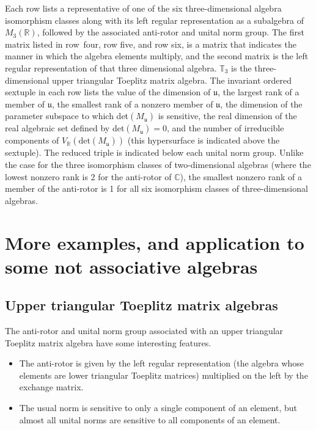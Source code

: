 \documentclass{amsart}
\numberwithin{equation}{section}
\theoremstyle{definition}
\numberwithin{theorem}{section}
\begin{document}
 {\small Each row lists a representative  of one of the six three-dimensional algebra isomorphism classes along with its left regular representation as a subalgebra of $M_3(\mathbb{R})$, followed by the associated anti-rotor and unital norm group. The first matrix listed in \mbox{row four}, row five, and row six, is a matrix that indicates the manner in which the algebra elements multiply, and the second matrix is the left regular representation of that three dimensional algebra.  $\mathbb{T}_3$ is the three-dimensional upper triangular Toeplitz matrix algebra. The invariant ordered sextuple in each row lists the value of the dimension of $\mathfrak{u}$, the largest rank of a member of $\mathfrak{u}$, the smallest rank of a nonzero member of $\mathfrak{u}$, the dimension of the parameter subspace to which det$(M_{\mathfrak{u}})$ is sensitive, the real dimension of the real algebraic set defined by det$(M_{\mathfrak{u}}) =0$, and the number of irreducible components of $V_\mathbb{R}(\text{det}(M_{\mathfrak{u}}))$ (this hypersurface is indicated above the sextuple).  The reduced triple is indicated below each unital norm group.  Unlike the case for the three isomorphism classes of two-dimensional algebras (where the lowest nonzero rank is 2 for the anti-rotor of $\mathbb{C}$), the smallest nonzero rank of a member of the anti-rotor is 1 for all six isomorphism classes of three-dimensional algebras.}
 
\vfill
\hspace{0pt}
\pagebreak

\section{More examples, and application to some not associative algebras}
\subsection{Upper triangular Toeplitz matrix algebras}

The anti-rotor and unital norm group associated with an upper triangular Toeplitz matrix algebra have some interesting features.
\begin{itemize}\item The anti-rotor is given by the left regular representation (the algebra whose elements are lower triangular Toeplitz matrices) multiplied on the left by the exchange matrix. \item The usual norm is sensitive to only a single component of an element, but almost all unital norms are sensitive to all components of an element.\end{itemize}
\end{document}
